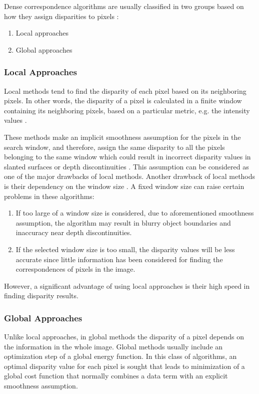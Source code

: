 \documentclass[12pt]{report}
\begin{document}
Dense correspondence algorithms are usually classified in two groups based on how they assign
disparities to pixels \cite{sze11}:
\begin{enumerate}
\item Local approaches
\item Global approaches
\end{enumerate}

\subsubsection{Local Approaches} 

Local methods tend to find the disparity of each pixel based on its neighboring pixels. In
other words, the disparity of a pixel is calculated in a finite window containing its neighboring pixels, based on a particular metric, e.g. the intensity values \cite{sch02}.

These methods make an implicit smoothness assumption for the pixels in the search
window, and therefore, assign the same disparity to all the pixels belonging to the same window which could result in incorrect disparity values in slanted surfaces or
depth discontinuities \cite{hirsch02}. This assumption can be considered as one of the major drawbacks of local methods.
Another drawback of local methods is their dependency on the window size \cite{sch02}. A fixed window size can raise certain problems in these algorithms:
\begin{enumerate}
\item If too large of a window size is considered, due to aforementioned smoothness assumption, the algorithm may result in blurry object boundaries and inaccuracy near depth discontinuities.
\item If the selected window size is too small, the disparity values will be less accurate since little information has been considered for 
finding the correspondences of pixels in the image.
\end{enumerate}

However, a significant advantage of using local approaches is their high speed in finding disparity results.\newline

\subsubsection{Global Approaches}
Unlike local approaches, in global methods the disparity of a pixel depends on the information in
the whole image. Global methods usually include an optimization step of a global energy
function\cite{roy98,bobi99,boyk01,hong10}. In this class of algorithms, an optimal disparity value for each pixel is sought that leads to minimization of a global cost
function that normally combines a data term with an explicit smoothness assumption.
\end{document}
